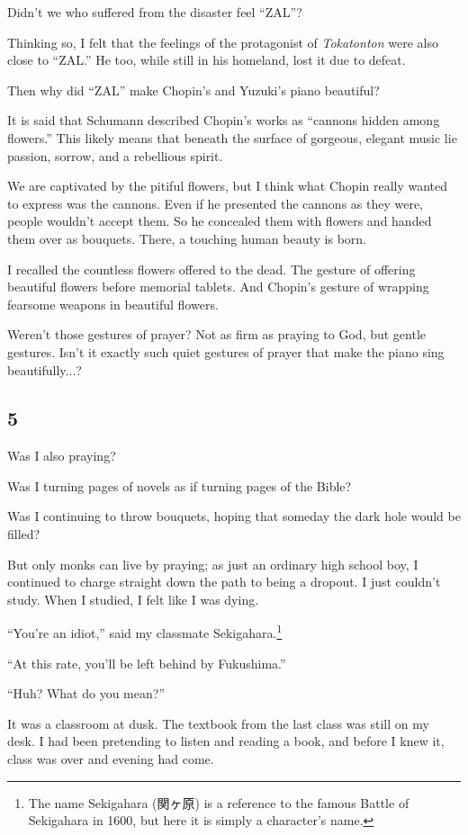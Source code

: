 \documentclass[
    a4paper,
    12pt,
    twoside,
    openany,
    UTF8,
    fontset=windows
]{ctexbook}
\begin{document}
Didn't we who suffered from the disaster feel ``ZAL''?

Thinking so, I felt that the feelings of the protagonist of \textit{Tokatonton} were also close to ``ZAL.'' He too, while still in his homeland, lost it due to defeat.

Then why did ``ZAL'' make Chopin's and Yuzuki's piano beautiful?

It is said that Schumann described Chopin's works as ``cannons hidden among flowers.'' This likely means that beneath the surface of gorgeous, elegant music lie passion, sorrow, and a rebellious spirit.

We are captivated by the pitiful flowers, but I think what Chopin really wanted to express was the cannons. Even if he presented the cannons as they were, people wouldn't accept them. So he concealed them with flowers and handed them over as bouquets. There, a touching human beauty is born.

I recalled the countless flowers offered to the dead. The gesture of offering beautiful flowers before memorial tablets. And Chopin's gesture of wrapping fearsome weapons in beautiful flowers.

Weren't those gestures of prayer? Not as firm as praying to God, but gentle gestures. Isn't it exactly such quiet gestures of prayer that make the piano sing beautifully...?


\subsection*{5}

Was I also praying?

Was I turning pages of novels as if turning pages of the Bible?

Was I continuing to throw bouquets, hoping that someday the dark hole would be filled?

But only monks can live by praying; as just an ordinary high school boy, I continued to charge straight down the path to being a dropout. I just couldn't study. When I studied, I felt like I was dying.

``You're an idiot,'' said my classmate Sekigahara.\footnote{The name Sekigahara (関ヶ原) is a reference to the famous Battle of Sekigahara in 1600, but here it is simply a character's name.}

``At this rate, you'll be left behind by Fukushima.''

``Huh? What do you mean?''

It was a classroom at dusk. The textbook from the last class was still on my desk. I had been pretending to listen and reading a book, and before I knew it, class was over and evening had come.
\end{document}
